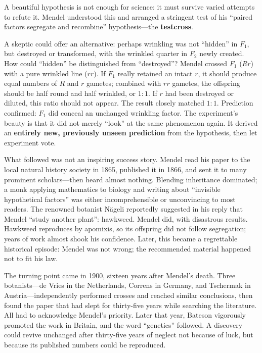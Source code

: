 \begin{zhengju}
A beautiful hypothesis is not enough for science: it must survive varied attempts to refute it. Mendel understood this and arranged a stringent test of his ``paired factors segregate and recombine'' hypothesis---the \textbf{testcross}.

A skeptic could offer an alternative: perhaps wrinkling was not ``hidden'' in $F_1$, but destroyed or transformed, with the wrinkled quarter in $F_2$ newly created. How could ``hidden'' be distinguished from ``destroyed''? Mendel crossed $F_1$ ($Rr$) with a pure wrinkled line ($rr$). If $F_1$ really retained an intact $r$, it should produce equal numbers of $R$ and $r$ gametes; combined with $rr$ gametes, the offspring should be half round and half wrinkled, or $1:1$. If $r$ had been destroyed or diluted, this ratio should not appear. The result closely matched $1:1$. Prediction confirmed: $F_1$ did conceal an unchanged wrinkling factor. The experiment's beauty is that it did not merely ``look'' at the same phenomenon again. It derived an \textbf{entirely new, previously unseen prediction} from the hypothesis, then let experiment vote.

What followed was not an inspiring success story. Mendel read his paper to the local natural history society in 1865, published it in 1866, and sent it to many prominent scholars---then heard almost nothing. Blending inheritance dominated; a monk applying mathematics to biology and writing about ``invisible hypothetical factors'' was either incomprehensible or unconvincing to most readers. The renowned botanist Nägeli reportedly suggested in his reply that Mendel ``study another plant'': hawkweed. Mendel did, with disastrous results. Hawkweed reproduces by apomixis, so its offspring did not follow segregation; years of work almost shook his confidence. Later, this became a regrettable historical episode: Mendel was not wrong; the recommended material happened not to fit his law.

The turning point came in 1900, sixteen years after Mendel's death. Three botanists---de Vries in the Netherlands, Correns in Germany, and Tschermak in Austria---independently performed crosses and reached similar conclusions, then found the paper that had slept for thirty-five years while searching the literature. All had to acknowledge Mendel's priority. Later that year, Bateson vigorously promoted the work in Britain, and the word ``genetics'' followed. A discovery could revive unchanged after thirty-five years of neglect not because of luck, but because its published numbers could be reproduced.


\end{zhengju}
